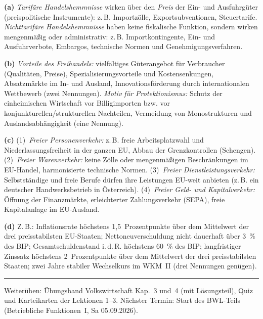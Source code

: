 \documentclass[11pt, a4paper]{article}
\begin{document}
\begin{loesung}[title={Lösung Aufgabe~9 --- Außenwirtschaft und EU}]
\textbf{(a)} \emph{Tarifäre Handelshemmnisse} wirken über den \emph{Preis} der Ein- und
Ausfuhrgüter (preispolitische Instrumente): z.\,B. Importzölle, Exportsubventionen,
Steuertarife. \emph{Nichttarifäre Handelshemmnisse} haben keine fiskalische Funktion,
sondern wirken mengenmäßig oder administrativ: z.\,B. Importkontingente, Ein- und
Ausfuhrverbote, Embargos, technische Normen und Genehmigungsverfahren.

\textbf{(b)} \emph{Vorteile des Freihandels:} vielfältiges Güterangebot für Verbraucher
(Qualitäten, Preise), Spezialisierungsvorteile und Kostensenkungen, Absatzmärkte im In-
und Ausland, Innovationsförderung durch internationalen Wettbewerb (zwei Nennungen).
\emph{Motiv für Protektionismus:} Schutz der einheimischen Wirtschaft vor Billigimporten
bzw. vor konjunkturellen/strukturellen Nachteilen, Vermeidung von Monostrukturen und
Auslandsabhängigkeit (eine Nennung).

\textbf{(c)} (1)~\emph{Freier Personenverkehr:} z.\,B. freie Arbeitsplatzwahl und
Niederlassungsfreiheit in der ganzen EU, Abbau der Grenzkontrollen (Schengen).
(2)~\emph{Freier Warenverkehr:} keine Zölle oder mengenmäßigen Beschränkungen im
EU-Handel, harmonisierte technische Normen. (3)~\emph{Freier Dienstleistungsverkehr:}
Selbstständige und freie Berufe dürfen ihre Leistungen EU-weit anbieten (z.\,B. ein
deutscher Handwerksbetrieb in Österreich). (4)~\emph{Freier Geld- und Kapitalverkehr:}
Öffnung der Finanzmärkte, erleichterter Zahlungsverkehr (SEPA), freie Kapitalanlage im
EU-Ausland.

\textbf{(d)} Z.\,B.: Inflationsrate höchstens 1,5~Prozentpunkte über dem Mittelwert der
drei preisstabilsten EU-Staaten; Nettoneuverschuldung nicht dauerhaft über 3~\% des BIP;
Gesamtschuldenstand i.\,d.\,R. höchstens 60~\% des BIP; langfristiger Zinssatz höchstens
2~Prozentpunkte über dem Mittelwert der drei preisstabilsten Staaten; zwei Jahre stabiler
Wechselkurs im WKM~II (drei Nennungen genügen).
\end{loesung}

\vspace{1em}
\hrule
\vspace{0.8em}
\noindent\textsf{\small Weiterüben: Übungsband Volkswirtschaft Kap.~3 und~4 (mit Lösungsteil), Quiz und
Karteikarten der Lektionen 1--3. Nächster Termin: Start des BWL-Teils (Betriebliche Funktionen~I, Sa 05.09.2026).}
\end{document}
